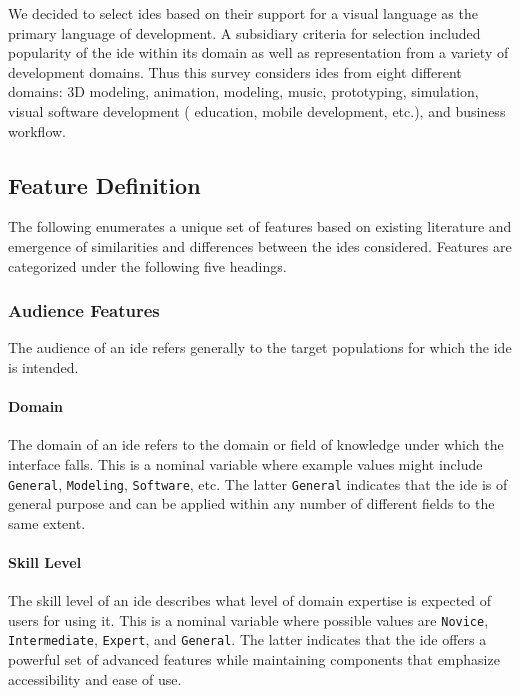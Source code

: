 We decided to select \acp{ide} based on their support for a visual language
as the primary language of development. A subsidiary criteria for
selection included popularity of the \ac{ide} within its domain as well as
representation from a variety of development domains. Thus this survey
considers \acp{ide} from eight different domains: 3D modeling, animation,
modeling, music, prototyping, simulation, visual software development (\eg
education, mobile development, etc.), and business workflow.


\subsection{Feature Definition} \label{subsec:featuredefinition}

The following enumerates a unique set of features based on existing literature and emergence of similarities and differences between the \acp{ide} considered.
Features are categorized under the following five headings.


\subsubsection{Audience Features} \label{subsubsec:audience}

The audience of an \ac{ide} refers generally to the target populations for which
the \ac{ide} is intended.


\paragraph{Domain}
The domain of an \ac{ide} refers to the domain or field of
knowledge under which the interface falls.
This is a nominal variable where example values might include \texttt{General}, \texttt{Modeling}, \texttt{Software}, etc.
The latter \texttt{General} indicates that the \ac{ide} is of general purpose and can be applied within any number of different fields to the same extent.


\paragraph{Skill Level}
The skill level of an \ac{ide} describes what level of domain expertise is expected of users for using it.
This is a nominal variable where possible values are \texttt{Novice}, \texttt{Intermediate}, \texttt{Expert}, and \texttt{General}.
The latter indicates that the \ac{ide} offers a powerful set of advanced features while maintaining components that emphasize accessibility and ease of use.


